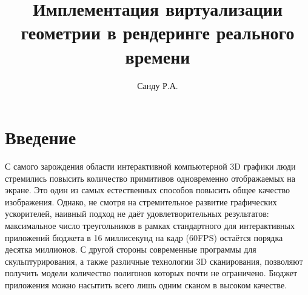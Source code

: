 \documentclass[12pt]{extarticle}
\begin{document}
\title{Имплементация виртуализации геометрии в рендеринге реального времени}

\author[1]{Санду Р.А.}

\maketitle
\thispagestyle{empty}

\newpage
\tableofcontents
\newpage

\section{Введение}
\label{sec:intro}
С самого зарождения области интерактивной компьютерной 3D графики люди стремились повысить количество примитивов одновременно отображаемых на экране. Это один из самых естественных способов повысить общее качество изображения. Однако, не смотря на стремительное развитие графических ускорителей, наивный подход не даёт удовлетворительных результатов: максимальное число треугольников в рамках стандартного для интерактивных приложений бюджета в 16 миллисекунд на кадр (60FPS) остаётся порядка десятка миллионов. С другой стороны современные программы для скульптурирования, а также различные технологии 3D сканирования, позволяют получить модели количество полигонов которых почти не ограничено. Бюджет приложения можно насытить всего лишь одним сканом в высоком качестве.
\end{document}
